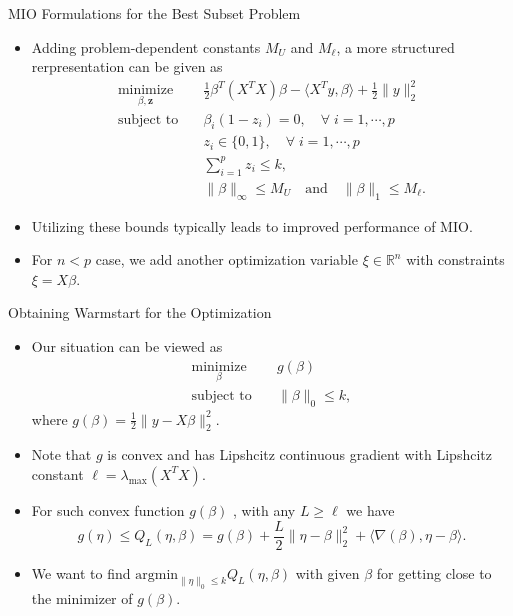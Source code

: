 \documentclass[blue, 10pt]{beamer}
\begin{document}
  
\begin{frame}{MIO Formulations for the Best Subset Problem}
  
  \begin{itemize}
    \item Adding problem-dependent constants $M_U$ and $M_\ell$, a more structured rerpresentation can be given as 
    \begin{align*}
      \underset{\beta, \mathbf{z}}{\text{minimize}} \quad& \frac{1}{2}\beta^T(X^TX)\beta-\langle X^Ty, \beta\rangle +\frac 12 \|y\|_2^2  \\
        \text{subject to} \quad& \beta_i(1-z_i)=0, \quad \forall \; i=1, \cdots, p \\
        &z_i\in \{0,1\}, \quad \forall \; i=1, \cdots, p\\
        &\sum_{i=1}^p z_i\leq k, \\
        &\|\beta\|_\infty \leq M_U \quad \text{and} \quad \|\beta\|_1\leq M_\ell.
    \end{align*}
    \item Utilizing these bounds typically leads to improved performance of MIO.
    \item For $n<p$ case, we add another optimization variable $\xi\in \mathbb{R}^n$ with constraints $\xi=X\beta$.
  \end{itemize}

\end{frame}
  

\begin{frame}{Obtaining Warmstart for the Optimization}
  
  \begin{itemize}
    \item Our situation can be viewed as
      \begin{equation*}
        \begin{split}
          \underset{\beta}{\text{minimize}} &\quad g(\beta) \\
          \text{subject to} &\quad \|\beta\|_0 \leq k,
        \end{split}
      \end{equation*}
      where $g(\beta) = \frac{1}{2} \|y-X\beta\|_2^2$. 
      \item Note that $g$ is convex and has Lipshcitz continuous gradient with Lipshcitz constant $\ell = \lambda_{\max}(X^T X)$.
    \item For such convex function $g(\beta)$ , with any $L\geq \ell$ we have $$g(\eta) \leq Q_{L} (\eta, \beta)= g(\beta)+\frac{L}{2}\|\eta-\beta\|_2^2+\langle \nabla(\beta), \eta-\beta \rangle.$$
    \item We want to find $\text{argmin}_{\|\eta\|_0\leq k} Q_L(\eta, \beta)$ with given $\beta$ for getting close to the minimizer of $g(\beta)$.
  \end{itemize}
  
\end{frame}
  
\end{document}
